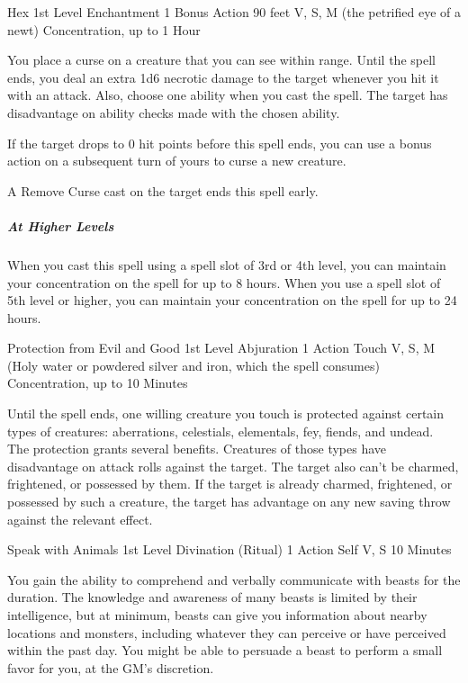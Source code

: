 \documentclass[letterpaper,openany,oneside,twocolumn]{book}
\begin{document}
\DndSpellHeader
  {Hex}
  {1st Level Enchantment}
  {1 Bonus Action}
  {90 feet}
  {V, S, M (the petrified eye of a newt)}
  {Concentration, up to 1 Hour}
  
You place a curse on a creature that you can see within range. Until the spell ends, you deal an extra 1d6 necrotic damage to the target whenever you hit it with an attack. Also, choose one ability when you cast the spell. The target has disadvantage on ability checks made with the chosen ability.

If the target drops to 0 hit points before this spell ends, you can use a bonus action on a subsequent turn of yours to curse a new creature.

A Remove Curse cast on the target ends this spell early.

\subparagraph*{At Higher Levels} When you cast this spell using a spell slot of 3rd or 4th level, you can maintain your concentration on the spell for up to 8 hours. When you use a spell slot of 5th level or higher, you can maintain your concentration on the spell for up to 24 hours.

\DndSpellHeader
  {Protection from Evil and Good}
  {1st Level Abjuration}
  {1 Action}
  {Touch}
  {V, S, M (Holy water or powdered silver and iron, which the spell consumes)}
  {Concentration, up to 10 Minutes}
  
Until the spell ends, one willing creature you touch is protected against certain types of creatures: aberrations, celestials, elementals, fey, fiends, and undead.\\
The protection grants several benefits. Creatures of those types have disadvantage on attack rolls against the target. The target also can't be charmed, frightened, or possessed by them. If the target is already charmed, frightened, or possessed by such a creature, the target has advantage on any new saving throw against the relevant effect.

\DndSpellHeader
  {Speak with Animals}
  {1st Level Divination (Ritual)}
  {1 Action}
  {Self}
  {V, S}
  {10 Minutes}
  
You gain the ability to comprehend and verbally communicate with beasts for the duration. The knowledge and awareness of many beasts is limited by their intelligence, but at minimum, beasts can give you information about nearby locations and monsters, including whatever they can perceive or have perceived within the past day. You might be able to persuade a beast to perform a small favor for you, at the GM's discretion.
\end{document}
